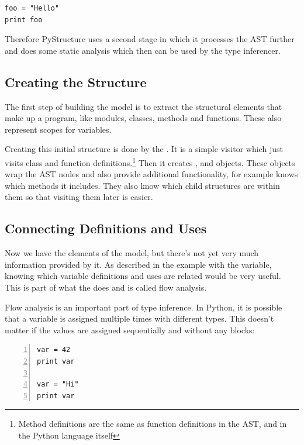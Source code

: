 \documentclass[12pt,halfparskip]{scrreprt}
\begin{document}
\begin{lstlisting}
foo = "Hello"
print foo
\end{lstlisting}

Therefore PyStructure uses a second stage in which it processes the AST further and does some static analysis which then can be used by the type inferencer.


\subsection{Creating the Structure}

The first step of building the model is to extract the structural elements that make up a program, like modules, classes, methods and functions. These also represent scopes for variables.

Creating this initial structure is done by the . It is a simple visitor which just visits class and function definitions.\footnote{Method definitions are the same as function definitions in the AST, and in the Python language itself} Then it creates ,  and  objects. These objects wrap the AST nodes and also provide additional functionality, for example  knows which methods it includes. They also know which child structures are within them so that visiting them later is easier.

\subsection{Connecting Definitions and Uses}

Now we have the elements of the model, but there's not yet very much information provided by it. As described in the example with the  variable, knowing which variable definitions and uses are related would be very useful. This is part of what the  does and is called flow analysis.

Flow analysis is an important part of type inference. In Python, it is possible that a variable is assigned multiple times with different types. This doesn't matter if the values are assigned sequentially and without any  blocks:

\begin{lstlisting}[numbers=left]
var = 42
print var

var = "Hi"
print var
\end{lstlisting}
\end{document}
